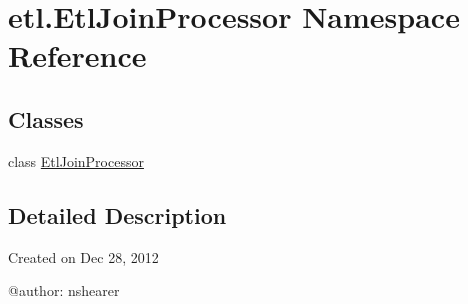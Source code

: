 \hypertarget{namespaceetl_1_1EtlJoinProcessor}{\section{etl.\-Etl\-Join\-Processor Namespace Reference}
\label{namespaceetl_1_1EtlJoinProcessor}
}
\subsection*{Classes}
\begin{DoxyCompactItemize}
\item 
class \hyperlink{classetl_1_1EtlJoinProcessor_1_1EtlJoinProcessor}{Etl\-Join\-Processor}
\end{DoxyCompactItemize}


\subsection{Detailed Description}
\begin{DoxyVerb}Created on Dec 28, 2012

@author: nshearer
\end{DoxyVerb}
 